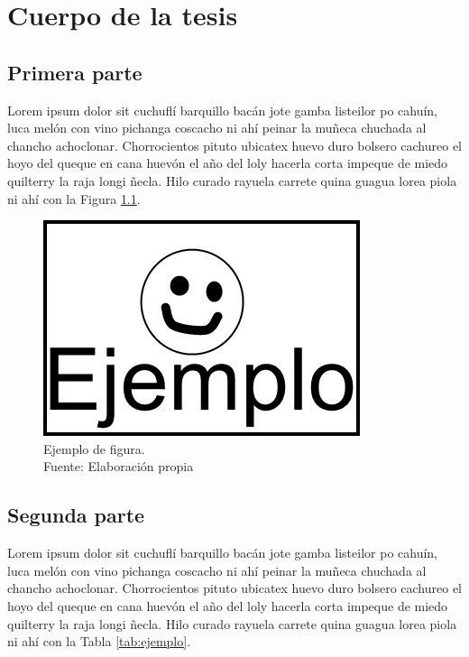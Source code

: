 \chapter{Cuerpo de la tesis}
\label{cap:cuerpo}

\section{Primera parte}
\label{sec:primera}

Lorem ipsum dolor sit cuchuflí barquillo bacán jote gamba listeilor po cahuín, luca melón con vino pichanga coscacho ni ahí peinar la muñeca chuchada al chancho achoclonar. Chorrocientos pituto ubicatex huevo duro bolsero cachureo el hoyo del queque en cana huevón el año del loly hacerla corta impeque de miedo quilterry la raja longi ñecla. Hilo curado rayuela carrete quina guagua lorea piola ni ahí con la Figura \ref{fig:ejemplo}.

\begin{figure}[!ht]
	\centering
	\captionsetup{justification=centering}
	\includegraphics[scale=0.6]{images/Ejemplo.png}
	\caption[Ejemplo de figura.]{Ejemplo de figura.\\Fuente: Elaboración propia}
	\label{fig:ejemplo}
\end{figure}

\section{Segunda parte}
\label{sec:segunda}

Lorem ipsum dolor sit cuchuflí barquillo bacán jote gamba listeilor po cahuín, luca melón con vino pichanga coscacho ni ahí peinar la muñeca chuchada al chancho achoclonar. Chorrocientos pituto ubicatex huevo duro bolsero cachureo el hoyo del queque en cana huevón el año del loly hacerla corta impeque de miedo quilterry la raja longi ñecla. Hilo curado rayuela carrete quina guagua lorea piola ni ahí con la Tabla \ref{tab:ejemplo}.

